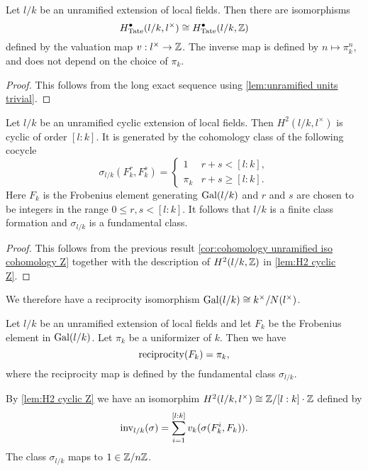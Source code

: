 \begin{corollary} \label{cor:cohomology unramified iso cohomology Z}
	Let $l/k$ be an unramified extension of local fields.
	Then there are isomorphisms
	\[
		H^\bullet_{\mathrm{Tate}}(l/k,l^\times) \cong H^\bullet_{\mathrm{Tate}} (l/k,{\mathbb Z})
	\]
	defined by the valuation map $v : l^\times \to {\mathbb Z}$.
	The inverse map is defined by $n \mapsto \pi_k^n$, and does not depend on the choice of $\pi_k$.
\end{corollary}

\begin{proof}
	This follows from the long exact sequence using \ref{lem:unramified units trivial}.
\end{proof}


\begin{lemma} \label{lem:unramified fundamental class}
	Let $l/k$ be an unramified cyclic extension of local fields.
	Then $H^2(l/k,l^\times)$ is cyclic of order $[l:k]$.
	It is generated by the cohomology class of the following cocycle
	\[
		\sigma_{l/k} (F_k^r, F_k^s) =
		\begin{cases}
			1 & r + s < [l:k], \\
			\pi_k & r + s \ge [l:k].
		\end{cases}
	\]
	Here $F_k$ is the Frobenius element generating $\mathrm{Gal}(l/k)$ and $r$ and $s$
	are chosen to be integers in the range $0 \le r,s <[l:k]$.
	It follows that $l / k$ is a finite class formation and $\sigma_{l/k}$ is a fundamental class.
\end{lemma}

\begin{proof}
	This follows from the previous result \ref{cor:cohomology unramified iso cohomology Z}
	together with the description of $H^2(l/k,{\mathbb Z})$ in \ref{lem:H2 cyclic Z}.
\end{proof}


We therefore have a reciprocity isomorphism $\mathrm{Gal}(l/k) \cong k^\times / N(l^\times)$.

\begin{lemma}
	Let $l/k$ be an unramified extension of local fields and let $F_k$ be the Frobenius
	element in $\mathrm{Gal}(l/k)$. Let $\pi_k$ be a uniformizer of $k$. Then we have
	\[
		\mathrm{reciprocity} (F_k)= \pi_k,
	\]
	where the reciprocity map is defined by the fundamental class $\sigma_{l/k}$.
\end{lemma}

By \ref{lem:H2 cyclic Z} we have an isomorphim $H^2(l/k, l^\times) \cong {\mathbb Z} / [l:k]\cdot {\mathbb Z}$
defined by
\[
	\mathrm{inv}_{l/k}(\sigma) = \sum_{i=1}^{[l:k]} v_k(\sigma(F_k^i, F_k)).
\]
The class $\sigma_{l/k}$ maps to $1 \in {\mathbb Z}/n{\mathbb Z}$.







